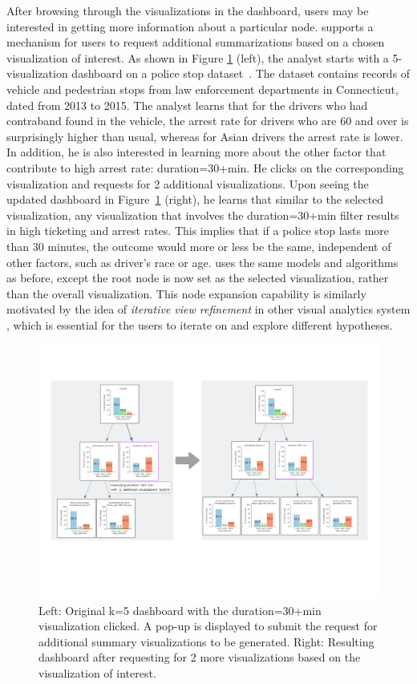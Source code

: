 \par After browsing through the visualizations in the dashboard, users may be interested in getting more information about a particular node. \system supports a mechanism for users to request additional summarizations based on a chosen visualization of interest. As shown in Figure \ref{fig:altroot_expansion} (left), the analyst starts with a 5-visualization dashboard on a police stop dataset~\cite{ctrp3}. The dataset contains  records of vehicle and pedestrian stops from law enforcement departments in Connecticut, dated from 2013 to 2015. The analyst learns that for the drivers who had contraband found in the vehicle, the arrest rate for drivers who are 60 and over is surprisingly higher than usual, whereas for Asian drivers the arrest rate is lower. In addition, he is also interested in learning more about the other factor that contribute to high arrest rate: duration=30+min. He clicks on the corresponding visualization and requests for 2 additional visualizations. Upon seeing the updated dashboard in Figure~\ref{fig:altroot_expansion} (right), he learns that similar to the selected visualization, any visualization that involves the duration=30+min filter results in high ticketing and arrest rates. This implies that if a police stop lasts more than 30 minutes, the outcome would more or less be the same, independent of other factors, such as driver's race or age. \system uses the same models and algorithms as before, except the root node is now set as the selected visualization, rather than the overall visualization. This node expansion capability is similarly motivated by the idea of \textit{iterative view refinement} in other visual analytics system \cite{Wongsuphasawat2016,Hoque2017}, which is essential for the users to iterate on and explore different hypotheses.

\begin{figure}[ht!]
\centering
\includegraphics[width=\linewidth]{figures/expansion_example.pdf}
\caption{Left: Original k=5 dashboard with the duration=30+min visualization clicked. A pop-up is displayed to submit the request for additional summary visualizations to be generated. Right: Resulting dashboard after requesting for 2 more visualizations based on the visualization of interest.}
\label{fig:altroot_expansion}
\end{figure}

